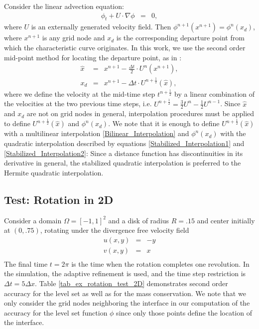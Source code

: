 \documentclass[english]{article}
\begin{document}
Consider the linear advection equation:
\begin{eqnarray}
\phi_t + U\cdot\nabla\phi&=&0, \label{Level_Set_Equation}
\end{eqnarray}
where $U$ is an externally generated velocity field. Then
$\phi^{n+1}(x^{n+1})=\phi^n(x_d)$, where $x^{n+1}$ is any grid node and
$x_d$ is the corresponding departure point from which the characteristic
curve originates. In this work, we use the second order mid-point method
for locating the departure point, as in \cite{Xiu:2001:Semi_Lagrangian_BD}:
$$ \begin{array}{rcl}
\hat{x} &=& x^{n+1} - \frac{\Delta t}2\cdot U^n(x^{n+1}), \\
x_d     &=& x^{n+1} -       \Delta t  \cdot U^{n+\frac12}(\hat{x}),
\end{array}
$$
where we define the velocity at the mid-time step $t^{n+\frac12}$ by a
linear combination of the velocities at the two previous time steps, i.e.
$U^{n+\frac12}=\frac32U^n-\frac12U^{n-1}$. Since $\hat{x}$ and $x_d$ are
not on grid nodes in general, interpolation procedures must be applied to
define $U^{n+\frac12}(\hat{x})$ and $\phi^n(x_d)$. We note that it is
enough to define $U^{n+\frac12}(\hat{x})$ with a multilinear interpolation
\eqref{Bilinear_Interpolation} and $\phi^n(x_d)$ with the quadratic
interpolation described by equations \eqref{Stabilized_Interpolation1} and
\eqref{Stabilized_Interpolation2}: Since a distance function has
discontinuities in its derivative in general, the stabilized quadratic
interpolation is preferred to the Hermite quadratic interpolation.

\subsection{Test: Rotation in 2D \label{ex_rotation_test_2D}}

Consider a domain $\Omega=[-1, 1]^2$ and a disk of radius $R=.15$ and center initially at $(0,
.75)$, rotating under the divergence free velocity field
$$
\begin{array}{lcr}
u(x,y) &=& -y \\
v(x,y) &=& x \\
\end{array}
$$
The final time $t=2\pi$ is the time when the rotation completes one
revolution. In the simulation, the adaptive refinement is used, and the
time step restriction is $\Delta t= 5\Delta x$. Table
\ref{tab_ex_rotation_test_2D} demonstrates second order accuracy for the
level set as well as for the mass conservation.  We note that we only
consider the grid nodes neighboring the interface in our computation of the
accuracy for the level set function $\phi$ since only those points define
the location of the interface.
\end{document}
